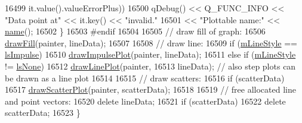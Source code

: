 \begin{DoxyCode}
16499                            it.value().valueErrorPlus))
16500       qDebug() << Q\_FUNC\_INFO << \textcolor{stringliteral}{"Data point at"} << it.key() << \textcolor{stringliteral}{"invalid."}
16501                << \textcolor{stringliteral}{"Plottable name:"} << \hyperlink{class_q_c_p_abstract_plottable_a1affc1972938e4364a9325e4e4e4dcea}{name}();
16502   \}
16503 \textcolor{preprocessor}{#endif}
16504 
16505   \textcolor{comment}{// draw fill of graph:}
16506   \hyperlink{class_q_c_p_graph_ad6d07926e6d6b7cfa70258780d47b7a0}{drawFill}(painter, lineData);
16507 
16508   \textcolor{comment}{// draw line:}
16509   \textcolor{keywordflow}{if} (\hyperlink{class_q_c_p_graph_a8604fd98402035a63375849f7341ee25}{mLineStyle} == \hyperlink{class_q_c_p_graph_ad60175cd9b5cac937c5ee685c32c0859aa3b358b4ae7cca94aceeb8e529c12ebb}{lsImpulse})
16510     \hyperlink{class_q_c_p_graph_abc01180629621f1e47e94559227d3d8c}{drawImpulsePlot}(painter, lineData);
16511   \textcolor{keywordflow}{else} \textcolor{keywordflow}{if} (\hyperlink{class_q_c_p_graph_a8604fd98402035a63375849f7341ee25}{mLineStyle} != \hyperlink{class_q_c_p_graph_ad60175cd9b5cac937c5ee685c32c0859aea9591b933733cc7b20786b71e60fa04}{lsNone})
16512     \hyperlink{class_q_c_p_graph_acebc22c3385829b19a87e6281fe6ade2}{drawLinePlot}(painter,
16513                  lineData); \textcolor{comment}{// also step plots can be drawn as a line plot}
16514 
16515   \textcolor{comment}{// draw scatters:}
16516   \textcolor{keywordflow}{if} (scatterData)
16517     \hyperlink{class_q_c_p_graph_a6bdc385b122ce06134d4196373ae2250}{drawScatterPlot}(painter, scatterData);
16518 
16519   \textcolor{comment}{// free allocated line and point vectors:}
16520   \textcolor{keyword}{delete} lineData;
16521   \textcolor{keywordflow}{if} (scatterData)
16522     \textcolor{keyword}{delete} scatterData;
16523 \}
\end{DoxyCode}


